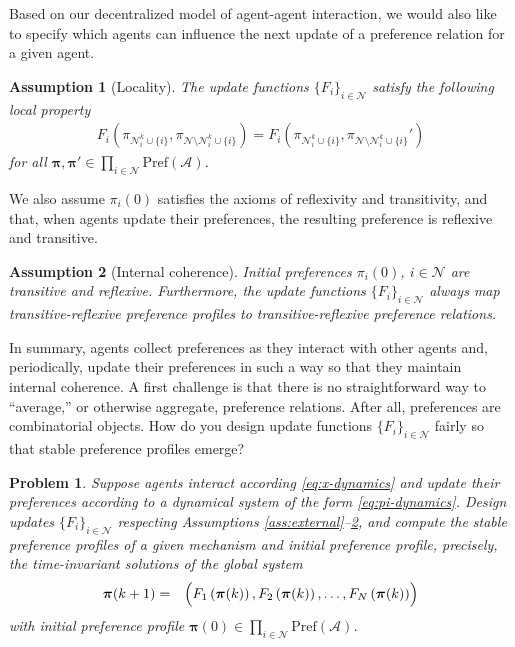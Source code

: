 \documentclass[conference]{ieeeconf}
\newcommand{\N}{\mathcal{N}}
\newcommand{\A}{\mathcal{A}}
\renewcommand{\P}{\mathrm{Pref}}
\newtheorem{assumption}{Assumption}
\newtheorem{problem}{Problem}
\begin{document}
Based on our decentralized model of agent-agent interaction, we would also like to specify which agents can influence the next update of a preference relation for a given agent.

\begin{assumption}[Locality]\label{ass:local}
    The update functions $\{F_i\}_{i \in \N}$ satisfy the following local property
\begin{align*}
    F_i \left(\pi_{\N_i^k\cup \{i\}}, \pi_{\N \setminus {\N_i^k \cup \{i\}}} \right) = F_i \left( \pi_{\N_i^k\cup \{i\}}, \pi_{\N \setminus {\N_i^k\cup \{i\}}}' \right)
\end{align*}
for all $\boldsymbol{\pi}, \boldsymbol{\pi}' \in \prod_{i \in \N} \P(\A)$.
\end{assumption}

We also assume $\pi_i(0)$ satisfies the axioms of reflexivity and transitivity, and that, when agents update their preferences, the resulting preference is reflexive and transitive.

\begin{assumption}[Internal coherence] \label{ass:internal}
    Initial preferences $\pi_i(0)$, $i \in \N$ are transitive and reflexive. Furthermore, the update functions $\{ F_i \}_{i \in \N}$ always map transitive-reflexive preference profiles to transitive-reflexive preference relations.
\end{assumption}

In summary, agents collect preferences as they interact with other agents and, periodically, update their preferences in such a way so that they maintain internal coherence. A first challenge is that there is no straightforward way to ``average,'' or otherwise aggregate, preference relations. After all, preferences are combinatorial objects. How do you design update functions $\{F_i\}_{i \in \N}$ fairly so that stable preference profiles emerge?

\begin{problem} \label{prob:dynamics}
    Suppose agents interact according \eqref{eq:x-dynamics} and update their preferences according to a dynamical system of the form \eqref{eq:pi-dynamics}. Design updates $\{F_i\}_{i \in \N}$ respecting Assumptions \ref{ass:external}--\ref{ass:internal}, and compute the stable preference profiles of a given mechanism and initial preference profile, precisely, the time-invariant solutions of the global system
    \begin{align}
    \begin{aligned}
        \boldsymbol{\pi}(k+1) &=& \Bigl( F_1\left(\boldsymbol{\pi}(k)\right), F_2\left(\boldsymbol{\pi}(k)\right), \dots, F_N\left(\boldsymbol{\pi}(k)\right)\Bigr)
    \end{aligned} \label{eq:pi-global-dynamics}
    \end{align}
    with initial preference profile $\boldsymbol{\pi}(0) \in \prod_{i \in \N} \P(\A)$.
\end{problem}
\end{document}
